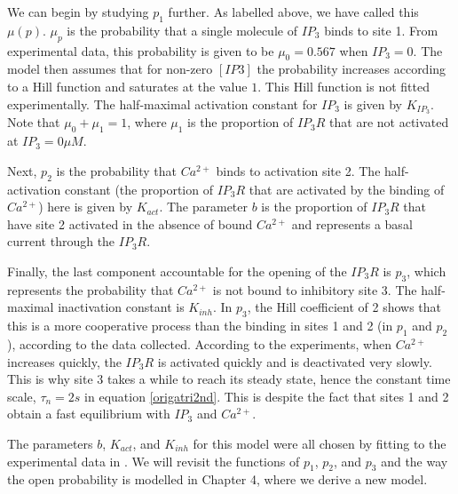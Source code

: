 We can begin by studying $p_1$ further. As labelled above, we have called this $\mu(p)$. {$\mu_p$ is the probability that a single molecule of $IP_3$ binds to site 1. From experimental data, this probability is given to be $\mu_0=0.567$ when $IP_3=0$. The model then assumes that for non-zero $[IP3]$ the probability increases according to a Hill function and saturates at the value $1$. This Hill function is not fitted experimentally.} The half-maximal activation constant for $IP_3$ is given by $K_{IP_3}$. Note that $\mu_0+\mu_1=1$, where $\mu_1$ is the proportion of $IP_3R$ that are not activated at $IP_3=0 \mu M$.

Next, $p_2$ is the probability that $Ca^{2+}$ binds to activation site 2. The half-activation constant (the proportion of $IP_3R$ that are activated by the binding of $Ca^{2+}$) here is given by $K_{act}$. The parameter $b$ is the proportion of $IP_3R$ that have site 2 activated in the absence of bound $Ca^{2+}$ and represents a basal current through the $IP_3R$. 

Finally, the last component accountable for the opening of the $IP_3R$ is $p_3$, which represents the probability that $Ca^{2+}$ is not bound to inhibitory site 3. The half-maximal inactivation constant is $K_{inh}$. In $p_3$, the Hill coefficient of 2 shows that this is a more cooperative process than the binding in sites 1 and 2 (in $p_1$ and $p_2$), according to the data collected. According to the experiments, when $Ca^{2+}$ increases quickly, the $IP_3R$ is activated quickly and is deactivated very slowly. This is why site 3 takes a while to reach its steady state, hence the constant time scale, $\tau_n=2s$ in equation \eqref{origatri2nd}. This is despite the fact that sites 1 and 2 obtain a fast equilibrium with $IP_3$ and $Ca^{2+}$. 

The parameters $b$, $K_{act}$, and $K_{inh}$ for this model were all chosen by fitting to the experimental data in . We will revisit the functions of $p_1$, $p_2$, and $p_3$ and the way the open probability is modelled in Chapter 4, where we derive a new model.


